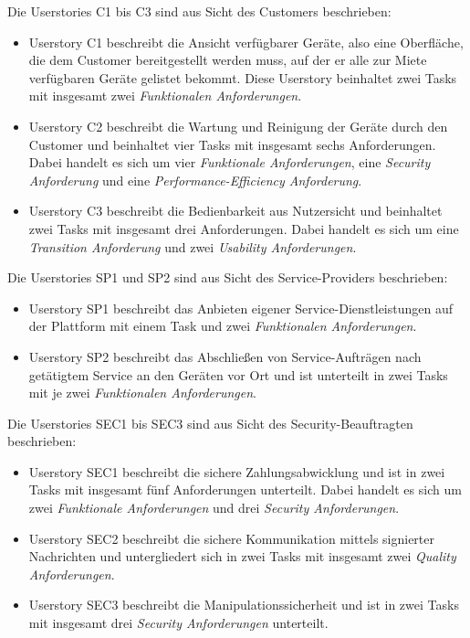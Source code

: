 Die Userstories C1 bis C3 sind aus Sicht des Customers beschrieben:
\begin{itemize}
  \item Userstory C1 beschreibt die Ansicht verfügbarer Geräte, also eine Oberfläche, die dem Customer bereitgestellt werden muss, auf der er alle zur Miete verfügbaren Geräte gelistet bekommt. Diese Userstory beinhaltet zwei Tasks mit insgesamt zwei \textit{Funktionalen Anforderungen}.
  \item Userstory C2 beschreibt die Wartung und Reinigung der Geräte durch den Customer und beinhaltet vier Tasks mit insgesamt sechs Anforderungen. Dabei handelt es sich um vier \textit{Funktionale Anforderungen}, eine \textit{Security Anforderung} und eine \textit{Performance-Efficiency Anforderung}.
  \item Userstory C3 beschreibt die Bedienbarkeit aus Nutzersicht und beinhaltet zwei Tasks mit insgesamt drei Anforderungen. Dabei handelt es sich um eine \textit{Transition Anforderung} und zwei \textit{Usability Anforderungen}.
\end{itemize}

Die Userstories SP1 und SP2 sind aus Sicht des Service-Providers beschrieben:
\begin{itemize}
  \item Userstory SP1 beschreibt das Anbieten eigener Service-Dienstleistungen auf der Plattform mit einem Task und zwei \textit{Funktionalen Anforderungen}.
  \item Userstory SP2 beschreibt das Abschließen von Service-Aufträgen nach getätigtem Service an den Geräten vor Ort und ist unterteilt in zwei Tasks mit je zwei \textit{Funktionalen Anforderungen}.
\end{itemize}

Die Userstories SEC1 bis SEC3 sind aus Sicht des Security-Beauftragten beschrieben:
\begin{itemize}
  \item Userstory SEC1 beschreibt die sichere Zahlungsabwicklung und ist in zwei Tasks mit insgesamt fünf Anforderungen unterteilt. Dabei handelt es sich um zwei \textit{Funktionale Anforderungen} und drei \textit{Security Anforderungen}.
  \item Userstory SEC2 beschreibt die sichere Kommunikation mittels signierter Nachrichten und untergliedert sich in zwei Tasks mit insgesamt zwei \textit{Quality Anforderungen}.
  \item Userstory SEC3 beschreibt die Manipulationssicherheit und ist in zwei Tasks mit insgesamt drei \textit{Security Anforderungen} unterteilt.
\end{itemize}


